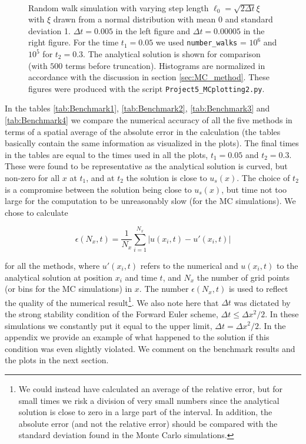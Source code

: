 \documentclass[a4paper, 11pt, notitlepage,english]{article}
\begin{document}
\begin{figure}[h!tb]
 \centering
 \mbox{\quad
 }
 \caption{Random walk simulation with varying step length $\ell_0 = \sqrt{2\Delta t}\xi$ with $\xi$ drawn from a normal distribution with mean 0 and standard deviation 1. $\Delta t = 0.005$ in the left figure and $\Delta t = 0.00005$ in the right figure. For the time $t_1 = 0.05$ we used \texttt{number\_walks} = $10^6$ and $10^5$ for $t_2 = 0.3$. The analytical solution is shown for comparison (with $500$ terms before truncation). Histograms are normalized in accordance with the discussion in section \ref{sec:MC_method}. These figures were produced with the script \texttt{Project5\_MCplotting2.py}.}
\label{fig:MC_gaussian}
\end{figure}

In the tables \ref{tab:Benchmark1}, \ref{tab:Benchmark2}, \ref{tab:Benchmark3} and \ref{tab:Benchmark4} we compare the numerical accuracy of all the five methods in terms of a 
spatial average of the absolute error in the calculation (the tables basically contain the same information as visualized in the plots). The final times in the tables are equal 
to the times used in all the plots, $t_1 = 0.05$ and $t_2 = 0.3$. These were found to be representative as the analytical solution is curved, but non-zero for all $x$ at
$t_1$, and at $t_2$ the solution is close to $u_s(x)$. The choice of $t_2$ is a compromise between the solution being close to $u_s(x)$, but time not too large for the
computation to be unreasonably slow (for the MC simulations). We chose to calculate

\begin{equation}
\epsilon(N_x,t) = \frac{1}{N_x}\sum_{i=1}^{N_x} \lvert u(x_i,t) - u'(x_i,t) \rvert
\label{eq:Mean_absolute_error}
\end{equation}

for all the methods, where $u'(x_i,t)$ refers to the numerical and $u(x_i,t)$ to the analytical solution at position $x_i$ and time $t$, and $N_x$ the number of grid points (or bins for the MC simulations) in $x$. The number $\epsilon(N_x,t)$ is used to reflect the quality of the numerical result\footnote{We could instead have calculated an average of the relative error, but for small times we risk a division of very small numbers since the analytical solution is close to zero in a large part of the interval. In addition, the absolute error (and not the relative error) should be compared with the standard deviation found in the Monte Carlo simulations.}. We also note here that $\Delta t$ was dictated by the strong stability condition of the Forward Euler scheme, $\Delta t \leq \Delta x^2 /2$. In these simulations we constantly put it equal to the upper limit, $\Delta t = \Delta x^2 /2$. In the appendix we provide an example of what happened to the solution if this condition was even slightly violated. We comment on the benchmark results and the plots in the next section.
\end{document}
